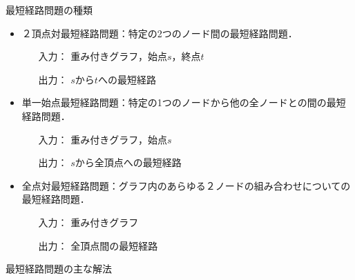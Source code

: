 \documentclass[12pt]{optlab-bachelor}
\begin{document}
\begin{description}
  \item[最短経路問題の種類]
\end{description}
\begin{itemize}
\item ２頂点対最短経路問題：特定の2つのノード間の最短経路問題．
\begin{itemize}
  \item[入力：]重み付きグラフ，始点$s$，終点$t$
  \item[出力：]$s$から$t$への最短経路
\end{itemize}
\item 単一始点最短経路問題：特定の1つのノードから他の全ノードとの間の最短経路問題．
\begin{itemize}
  \item[入力：]重み付きグラフ，始点$s$
  \item[出力：]$s$から全頂点への最短経路
\end{itemize}
\item 全点対最短経路問題：グラフ内のあらゆる２ノードの組み合わせについての最短経路問題．
\begin{itemize}
  \item[入力：]重み付きグラフ
  \item[出力：]全頂点間の最短経路
\end{itemize}
\end{itemize}
\begin{description}
  \item[最短経路問題の主な解法]
\end{description}
\end{document}
